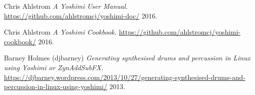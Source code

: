 \begin{thebibliography}{99}
   Chris Ahlstrom
   \emph{A Yoshimi User Manual.}
   \url{https://github.com/ahlstromcj/yoshimi-doc/}
   2016.

   Chris Ahlstrom
   \emph{A Yoshimi Cookbook.}
   \url{https://github.com/ahlstromcj/yoshimi-cookbook/}
   2016.
   
   Barney Holmes (djbarney)
   \emph{Generating synthesised drums and percussion in Linux using Yoshimi
   or ZynAddSubFX.}
   \url{https://djbarney.wordpress.com/2013/10/27/generating-synthesised-drums-and-percussion-in-linux-using-yoshimi/}
   2013.

\end{thebibliography}

